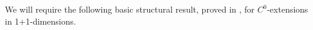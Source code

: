 \documentclass{article}
\newtheorem{prop}[definition]{Proposition}
\begin{document}

We will require the following basic structural result, proved in \cite{CameronSbierski}, for $C^0$-extensions in 1+1-dimensions.
\end{document}
